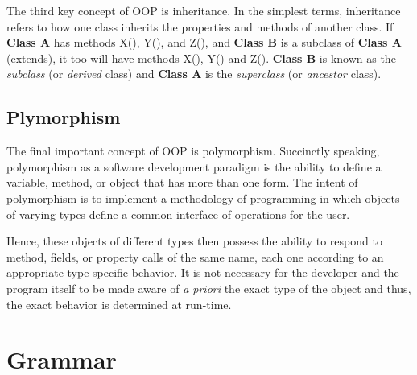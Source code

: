 \documentclass[12pt]{report}
\begin{document}
\begin{doublespace}
The third key concept of OOP is inheritance. In the simplest terms, inheritance refers to how one class inherits the properties and methods of another class. If \textbf{Class A} has methods X(), Y(), and Z(), and \textbf{Class B} is a subclass of \textbf{Class A} (extends), it too will have methods X(), Y() and Z(). \textbf{Class B} is known as the \textit{subclass} (or \textit{derived} class) and \textbf{Class A} is the \textit{superclass} (or \textit{ancestor} class).
\end{doublespace}

\subsection{Plymorphism}

\begin{doublespace}
The final important concept of OOP is polymorphism. Succinctly speaking, polymorphism as a software development paradigm is the ability to define a variable, method, or object that has more than one form. The intent of polymorphism is to implement a methodology of programming in which objects of varying types define a common interface of operations for the user.

Hence, these objects of different types then possess the ability to respond to method, fields, or property calls of the same name, each one according to an appropriate type-specific behavior. It is not necessary for the developer and the program itself to be made aware of \textit{a priori} the exact type of the object and thus, the exact behavior is determined at run-time.
\end{doublespace}

\section{Grammar}
\end{document}
